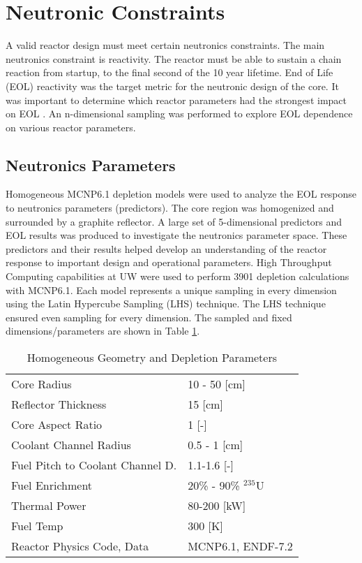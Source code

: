 \section{Neutronic Constraints}

A valid reactor design must meet certain neutronics constraints. The main
neutronics constraint is reactivity. The reactor must be able to sustain a chain
reaction from startup, to the final second of the 10 year lifetime. End of Life
(EOL) reactivity was the target metric for the neutronic design of the core. It
was important to determine which reactor parameters had the strongest impact on
EOL \keff. An n-dimensional sampling was performed to explore EOL \keff
dependence on various reactor parameters.

\subsection{Neutronics Parameters}
Homogeneous MCNP6.1 depletion models were used to analyze the EOL \keff response
to neutronics parameters (predictors). The core region was homogenized and
surrounded by a graphite reflector. A large set of 5-dimensional predictors and
EOL \keff results was produced to investigate the neutronics parameter space.
These predictors and their results helped develop an understanding of the
reactor response to important design and operational parameters. High Throughput
Computing capabilities at UW were used to perform 3901 depletion calculations
with MCNP6.1. Each model represents a unique sampling in every dimension using
the Latin Hypercube Sampling (LHS) technique. The LHS technique ensured even
sampling for every dimension. The sampled and fixed dimensions/parameters are
shown in Table \ref{tab:lhs_sweep_vars}.

\begin{table}[h]
  \centering
  \caption{Homogeneous Geometry and Depletion Parameters}
  \begin{tabular}{ll}
    \toprule
     Core Radius                		   & 10 - 50 [cm] \\
     Reflector Thickness				   & 15 [cm]\\
     Core Aspect Ratio					   & 1 [-] \\
     Coolant Channel Radius                & 0.5 - 1 [cm] \\
     Fuel Pitch to Coolant Channel D.      & 1.1-1.6 [-]\\
     Fuel Enrichment 					   & 20\% - 90\% $^{235}$U\\
     Thermal Power						   & 80-200 [kW]\\
     Fuel Temp  						   & 300 [K]\\
     Reactor Physics Code, Data			   & MCNP6.1, ENDF-7.2
  \end{tabular}
  \label{tab:lhs_sweep_vars}
\end{table}


